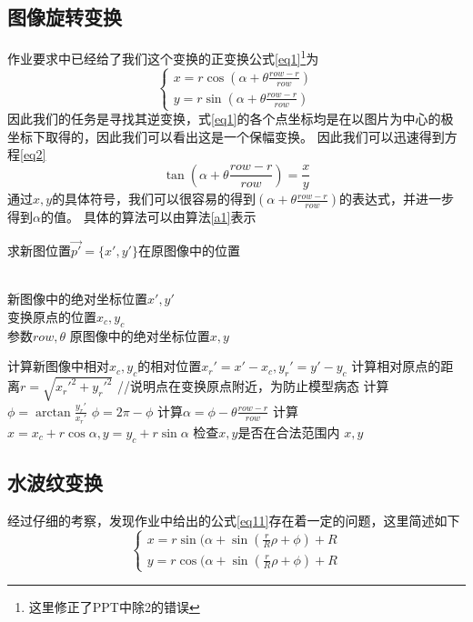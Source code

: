 \documentclass[UTF8,a4paper]{paper}
\begin{document}
\subsection{图像旋转变换}
作业要求中已经给了我们这个变换的正变换公式\ref{eq1}\footnote{这里修正了PPT中除2的错误}为
\begin{equation}\begin{cases}\displaystyle{
    x = r\cos(\alpha + \theta\frac{row - r}{row})} \\ \displaystyle{
    y = r\sin(\alpha + \theta\frac{row - r}{row})
}\end{cases}\label{eq1}\end{equation}
因此我们的任务是寻找其逆变换，式\ref{eq1}的各个点坐标均是在以图片为中心的极坐标下取得的，因此我们可以看出这是一个保幅变换。
因此我们可以迅速得到方程\ref{eq2}
\begin{equation}\tan(\alpha + \theta\frac{row - r}{row}) = \frac{x}{y}\label{eq2}\end{equation}
通过$x,y$的具体符号，我们可以很容易的得到$(\alpha + \theta\frac{row - r}{row})$的表达式，并进一步得到$\alpha$的值。
具体的算法可以由算法\ref{a1}表示
\begin{algorithm}[h]\caption{求新图位置$\vec{p'} = \{x',y'\}$在原图像中的位置}\label{a1}\begin{algorithmic}
    \Require \\ 新图像中的绝对坐标位置$x',y'$\\ 变换原点的位置$x_c,y_c$\\ 参数$row,\theta$
    \Ensure 原图像中的绝对坐标位置$x,y$\end{algorithmic}\begin{algorithmic}[1]
    \State 计算新图像中相对$x_c,y_c$的相对位置$x_r' = x' - x_c, y_r' = y' - y_c$
    \State 计算相对原点的距离$r = \sqrt{x_r'^2 + y_r'^2}$
        \State //说明点在变换原点附近，为防止模型病态
        \State {}
    \EndIf
    \State 计算$\phi = \arctan\frac{y_r'}{x_r'}$
        \State $\phi = 2\pi - \phi$
    \EndIf
    \State 计算$\alpha = \phi - \theta\frac{row - r}{row}$
    \State 计算$x = x_c + r\cos\alpha, y = y_c + r\sin\alpha$
    \State 检查$x,y$是否在合法范围内
    \State \Return $x,y$
    \EndFunction
\end{algorithmic}\end{algorithm}
\subsection{水波纹变换}
经过仔细的考察，发现作业中给出的公式\ref{eq11}存在着一定的问题，这里简述如下
\begin{equation}\begin{cases}\displaystyle{
    x = r\sin(\alpha + \sin(\frac{r}{R}\rho + \phi) + R} \\ \displaystyle{
    y = r\cos(\alpha + \sin(\frac{r}{R}\rho + \phi) + R
}\end{cases}\label{eq11}\end{equation}
\end{document}
